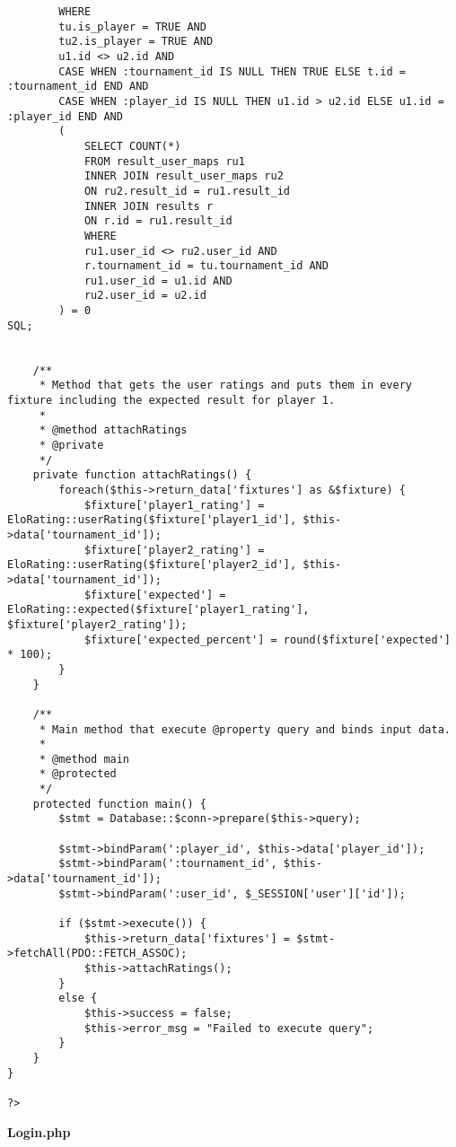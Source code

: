 {\begin{lstlisting}
		WHERE
		tu.is_player = TRUE AND
		tu2.is_player = TRUE AND
		u1.id <> u2.id AND
		CASE WHEN :tournament_id IS NULL THEN TRUE ELSE t.id = :tournament_id END AND
		CASE WHEN :player_id IS NULL THEN u1.id > u2.id ELSE u1.id = :player_id END AND
		(
			SELECT COUNT(*)
			FROM result_user_maps ru1
			INNER JOIN result_user_maps ru2
			ON ru2.result_id = ru1.result_id
			INNER JOIN results r
			ON r.id = ru1.result_id
			WHERE
			ru1.user_id <> ru2.user_id AND
			r.tournament_id = tu.tournament_id AND
			ru1.user_id = u1.id AND
			ru2.user_id = u2.id
		) = 0
SQL;


	/**
	 * Method that gets the user ratings and puts them in every fixture including the expected result for player 1.
	 *
	 * @method attachRatings
	 * @private
	 */
	private function attachRatings() {
		foreach($this->return_data['fixtures'] as &$fixture) {
			$fixture['player1_rating'] = EloRating::userRating($fixture['player1_id'], $this->data['tournament_id']);
			$fixture['player2_rating'] = EloRating::userRating($fixture['player2_id'], $this->data['tournament_id']);
			$fixture['expected'] = EloRating::expected($fixture['player1_rating'], $fixture['player2_rating']);
			$fixture['expected_percent'] = round($fixture['expected'] * 100);
		}
	}

	/**
	 * Main method that execute @property query and binds input data.
	 *
	 * @method main
	 * @protected
	 */
	protected function main() {
		$stmt = Database::$conn->prepare($this->query);

		$stmt->bindParam(':player_id', $this->data['player_id']);
		$stmt->bindParam(':tournament_id', $this->data['tournament_id']);
		$stmt->bindParam(':user_id', $_SESSION['user']['id']);

		if ($stmt->execute()) {
			$this->return_data['fixtures'] = $stmt->fetchAll(PDO::FETCH_ASSOC);
			$this->attachRatings();
		}
		else {
			$this->success = false;
			$this->error_msg = "Failed to execute query";
		}
	}
}

?>
\end{lstlisting}
}
\textbf{Login.php}\label{Login.php}

